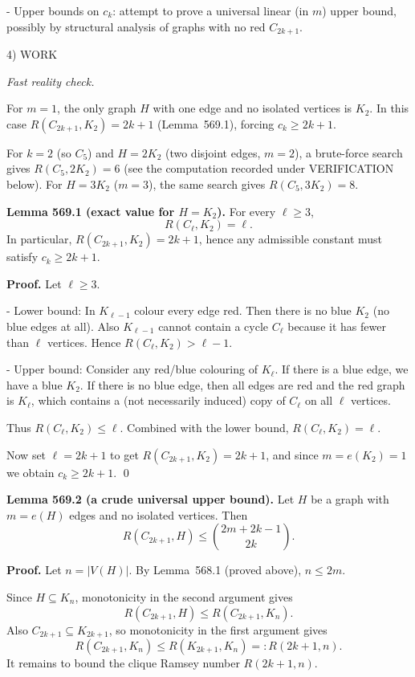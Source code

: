 - Upper bounds on $c_k$: attempt to prove a universal linear (in $m$) upper bound, possibly by structural analysis of graphs with no red $C_{2k+1}$.

4) WORK

\emph{Fast reality check.}

For $m=1$, the only graph $H$ with one edge and no isolated vertices is $K_2$. In this case $R(C_{2k+1},K_2)=2k+1$ (Lemma~569.1), forcing $c_k\ge 2k+1$.

For $k=2$ (so $C_5$) and $H=2K_2$ (two disjoint edges, $m=2$), a brute-force search gives $R(C_5,2K_2)=6$ (see the computation recorded under VERIFICATION below). For $H=3K_2$ ($m=3$), the same search gives $R(C_5,3K_2)=8$.

\medskip

\textbf{Lemma 569.1 (exact value for $H=K_2$).}
For every $\ell\ge 3$,
\[
R(C_{\ell},K_2)=\ell.
\]
In particular, $R(C_{2k+1},K_2)=2k+1$, hence any admissible constant must satisfy $c_k\ge 2k+1$.

\textbf{Proof.}
Let $\ell\ge 3$.

- Lower bound: In $K_{\ell-1}$ colour every edge red. Then there is no blue $K_2$ (no blue edges at all). Also $K_{\ell-1}$ cannot contain a cycle $C_{\ell}$ because it has fewer than $\ell$ vertices. Hence $R(C_{\ell},K_2)>\ell-1$.

- Upper bound: Consider any red/blue colouring of $K_{\ell}$. If there is a blue edge, we have a blue $K_2$. If there is no blue edge, then all edges are red and the red graph is $K_{\ell}$, which contains a (not necessarily induced) copy of $C_{\ell}$ on all $\ell$ vertices.

Thus $R(C_{\ell},K_2)\le \ell$. Combined with the lower bound, $R(C_{\ell},K_2)=\ell$.

Now set $\ell=2k+1$ to get $R(C_{2k+1},K_2)=2k+1$, and since $m=e(K_2)=1$ we obtain $c_k\ge 2k+1$.
\qed

\medskip

\textbf{Lemma 569.2 (a crude universal upper bound).}
Let $H$ be a graph with $m=e(H)$ edges and no isolated vertices. Then
\[
R(C_{2k+1},H) \le \binom{2m+2k-1}{2k}.
\]

\textbf{Proof.}
Let $n=|V(H)|$. By Lemma~568.1 (proved above), $n\le 2m$.

Since $H\subseteq K_n$, monotonicity in the second argument gives
\[
R(C_{2k+1},H) \le R(C_{2k+1},K_n).
\]
Also $C_{2k+1}\subseteq K_{2k+1}$, so monotonicity in the first argument gives
\[
R(C_{2k+1},K_n) \le R(K_{2k+1},K_n)=:R(2k+1,n).
\]
It remains to bound the clique Ramsey number $R(2k+1,n)$.

